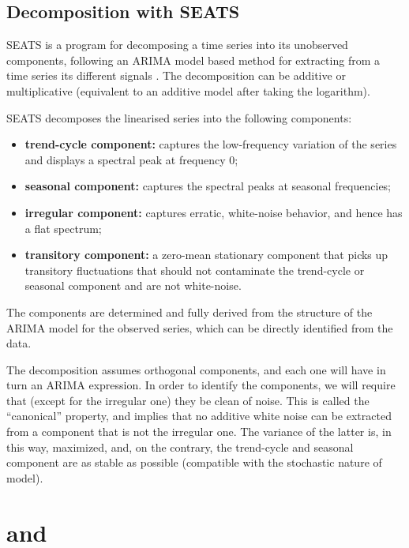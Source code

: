 \documentclass[article]{jss}
\providecommand{\tightlist}{%
  \setlength{\itemsep}{0pt}\setlength{\parskip}{0pt}}
\begin{document}
\hypertarget{sa-seats}{%
\subsection{Decomposition with SEATS}\label{sa-seats}}

SEATS is a program for decomposing a time series into its unobserved
components, following an ARIMA model based method for extracting from a
time series its different signals
\citep{gomez1996programs, caporello2004program}. The decomposition can
be additive or multiplicative (equivalent to an additive model after
taking the logarithm).

SEATS decomposes the linearised series into the following components:

\begin{itemize}
\tightlist
\item
  \textbf{trend-cycle component:} captures the low-frequency variation
  of the series and displays a spectral peak at frequency 0;\\
\item
  \textbf{seasonal component:} captures the spectral peaks at seasonal
  frequencies;\\
\item
  \textbf{irregular component:} captures erratic, white-noise behavior,
  and hence has a flat spectrum;\\
\item
  \textbf{transitory component:} a zero-mean stationary component that
  picks up transitory fluctuations that should not contaminate the
  trend-cycle or seasonal component and are not white-noise.
\end{itemize}

The components are determined and fully derived from the structure of
the ARIMA model for the observed series, which can be directly
identified from the data.

The decomposition assumes orthogonal components, and each one will have
in turn an ARIMA expression. In order to identify the components, we
will require that (except for the irregular one) they be clean of noise.
This is called the ``canonical'' property, and implies that no additive
white noise can be extracted from a component that is not the irregular
one. The variance of the latter is, in this way, maximized, and, on the
contrary, the trend-cycle and seasonal component are as stable as
possible (compatible with the stochastic nature of model).

\section[JDemetra+ and RJDemetra]{ and }
\end{document}
